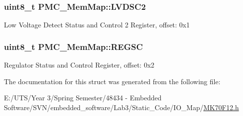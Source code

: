 \subsubsection[{L\+V\+D\+S\+C2}]{\setlength{\rightskip}{0pt plus 5cm}uint8\+\_\+t P\+M\+C\+\_\+\+Mem\+Map\+::\+L\+V\+D\+S\+C2}\label{struct_p_m_c___mem_map_a934db8b39dae8b99a9a9165df50145f5}
Low Voltage Detect Status and Control 2 Register, offset\+: 0x1 \hypertarget{struct_p_m_c___mem_map_aa14a55a46cc237589d6c01ebf7676c2a}{}
\subsubsection[{R\+E\+G\+S\+C}]{\setlength{\rightskip}{0pt plus 5cm}uint8\+\_\+t P\+M\+C\+\_\+\+Mem\+Map\+::\+R\+E\+G\+S\+C}\label{struct_p_m_c___mem_map_aa14a55a46cc237589d6c01ebf7676c2a}
Regulator Status and Control Register, offset\+: 0x2 

The documentation for this struct was generated from the following file\+:\begin{DoxyCompactItemize}
\item 
E\+:/\+U\+T\+S/\+Year 3/\+Spring Semester/48434 -\/ Embedded Software/\+S\+V\+N/embedded\+\_\+software/\+Lab3/\+Static\+\_\+\+Code/\+I\+O\+\_\+\+Map/\hyperlink{_m_k70_f12_8h}{M\+K70\+F12.\+h}\end{DoxyCompactItemize}
